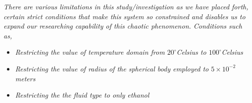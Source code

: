 \textit{There are various limitations in this study/investigation as we have placed forth, certain strict conditions that make this system so constrained and disables us to expand our researching capability of this chaotic phenomenon. Conditions such as,}
        
    \begin{itemize}
        \item \textit{Restricting the value of temperature domain from $20^\circ$Celsius to $100^\circ$Celsius}
        \item \textit{Restricting the value of radius of the spherical body employed to $5\times10^{-2}$ meters}
        \item \textit{Restricting the the fluid type to only ethanol}
    \end{itemize}
        
        

